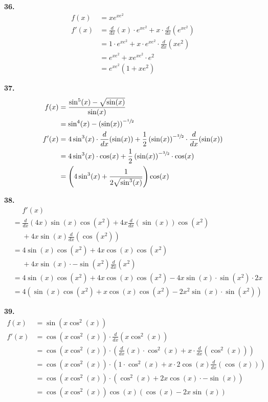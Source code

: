 \documentclass[10pt,oneside,]{book}
\theoremstyle{plain}
\theoremstyle{definition}
\numberwithin{equation}{section}
\newcommand{\fe}[2]{#1\mathopen{}\left(#2\right)\mathclose{}}
\newcommand{\fd}[1]{#1'}
\newcommand{\lzoo}[2]{{\frac{d}{d#1}}{\left(#2\right)}}
\begin{document}
\par\smallskip
\noindent\textbf{36.}\quad{}\begin{align*}
\fe{f}{x}&=xe^{xe^2}\\
\fe{\fd{f}}{x}&=\lzoo{x}{x}\cdot e^{xe^2}+x\cdot \lzoo{x}{e^{xe^2}}\\
&=1\cdot e^{xe^2}+x\cdot e^{xe^2}\cdot\lzoo{x}{xe^2}\\
&=e^{xe^2}+x e^{xe^2}\cdot e^2\\
&=e^{xe^2}\left(1+xe^2\right)
\end{align*}%
\par\smallskip
\noindent\textbf{37.}\quad{}\begin{align*}
\fe{f}{x}&=\frac{\fe{\sin^5}{x}-\sqrt{\fe{\sin}{x}}}{\fe{\sin}{x}}\\
&=\fe{\sin^4}{x}-\left(\fe{\sin}{x}\right)^{-\sfrac{1}{2}}\\
\fe{\fd{f}}{x}&=4\fe{\sin^3}{x}\cdot\lzoo{x}{\fe{\sin}{x}}+\frac{1}{2}\left(\fe{\sin}{x}\right)^{-\sfrac{3}{2}}\cdot\lzoo{x}{\fe{\sin}{x}}\\
&=4\fe{\sin^3}{x}\cdot\fe{\cos}{x}+\frac{1}{2}\left(\fe{\sin}{x}\right)^{-\sfrac{3}{2}}\cdot\fe{\cos}{x}\\
&=\left(4\fe{\sin^3}{x}+\frac{1}{2\sqrt{\fe{\sin^3}{x}}}\right)\fe{\cos}{x}
\end{align*}%
\par\smallskip
\noindent\textbf{38.}\quad{}\begin{align*}
&\phantom{{}={}}\fe{\fd{f}}{x}\\
&=\lzoo{x}{4x}\fe{\sin}{x}\fe{\cos}{x^2}+4x\lzoo{x}{\fe{\sin}{x}}\fe{\cos}{x^2}\\
&\phantom{{}={}}{}+4x\fe{\sin}{x}\lzoo{x}{\fe{\cos}{x^2}}\\
&=4\fe{\sin}{x}\fe{\cos}{x^2}+4x\fe{\cos}{x}\fe{\cos}{x^2}\\
&\phantom{{}={}}{}+4x\fe{\sin}{x}\cdot-\fe{\sin}{x^2}\lzoo{x}{x^2}\\
&=4\fe{\sin}{x}\fe{\cos}{x^2}+4x\fe{\cos}{x}\fe{\cos}{x^2}-4x\fe{\sin}{x}\cdot\fe{\sin}{x^2}\cdot2x\\
&=4\left(\fe{\sin}{x}\fe{\cos}{x^2}+x\fe{\cos}{x}\fe{\cos}{x^2}-2x^2\fe{\sin}{x}\cdot\fe{\sin}{x^2}\right)
\end{align*}%
\par\smallskip
\noindent\textbf{39.}\quad{}\begin{align*}
\fe{f}{x}&=\fe{\sin}{x\fe{\cos^2}{x}}\\
\fe{\fd{f}}{x}&=\fe{\cos}{x\fe{\cos^2}{x}}\cdot\lzoo{x}{x\fe{\cos^2}{x}}\\
&=\fe{\cos}{x\fe{\cos^2}{x}}\cdot\left(\lzoo{x}{x}\cdot\fe{\cos^2}{x}+x\cdot\lzoo{x}{\fe{\cos^2}{x}}\right)\\
&=\fe{\cos}{x\fe{\cos^2}{x}}\cdot\left(1\cdot\fe{\cos^2}{x}+x\cdot2\fe{\cos}{x}\lzoo{x}{\fe{\cos}{x}}\right)\\
&=\fe{\cos}{x\fe{\cos^2}{x}}\cdot\left(\fe{\cos^2}{x}+2x\fe{\cos}{x}\cdot-\fe{\sin}{x}\right)\\
&=\fe{\cos}{x\fe{\cos^2}{x}}\fe{\cos}{x}\left(\fe{\cos}{x}-2x\fe{\sin}{x}\right)
\end{align*}%
\par\smallskip
\end{document}
